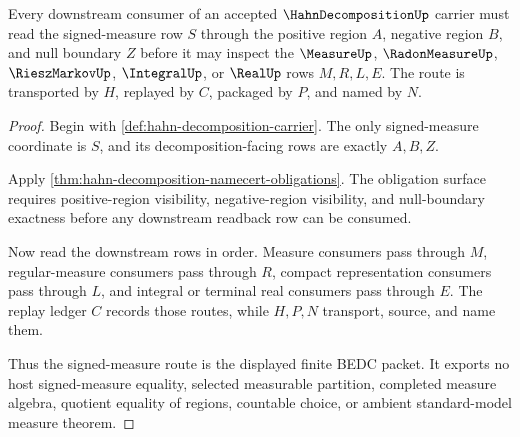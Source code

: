 \begin{theorem}
\label{thm:hahn-decomposition-signed-measure-route}
Every downstream consumer of an accepted $\HahnDecompositionUp$ carrier must read the signed-measure row $S$ through the positive region $A$, negative region $B$, and null boundary $Z$ before it may inspect the $\MeasureUp$, $\RadonMeasureUp$, $\RieszMarkovUp$, $\IntegralUp$, or $\RealUp$ rows $M,R,L,E$. The route is transported by $H$, replayed by $C$, packaged by $P$, and named by $N$.
\end{theorem}
\begin{proof}
Begin with \autoref{def:hahn-decomposition-carrier}. The only signed-measure coordinate is $S$, and its decomposition-facing rows are exactly $A,B,Z$.

Apply \autoref{thm:hahn-decomposition-namecert-obligations}. The obligation surface requires positive-region visibility, negative-region visibility, and null-boundary exactness before any downstream readback row can be consumed.

Now read the downstream rows in order. Measure consumers pass through $M$, regular-measure consumers pass through $R$, compact representation consumers pass through $L$, and integral or terminal real consumers pass through $E$. The replay ledger $C$ records those routes, while $H,P,N$ transport, source, and name them.

Thus the signed-measure route is the displayed finite BEDC packet. It exports no host signed-measure equality, selected measurable partition, completed measure algebra, quotient equality of regions, countable choice, or ambient standard-model measure theorem.
\end{proof}


